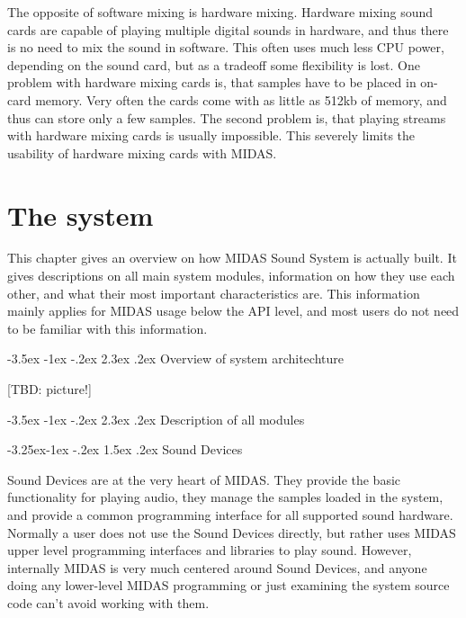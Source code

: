 \documentclass[a4paper,12pt,oneside]{book}
\makeatletter
\renewcommand\section{\@startsection {section}{1}{-20pt}%
                                   {-3.5ex \@plus -1ex \@minus -.2ex}%
                                   {2.3ex \@plus.2ex}%
                                   {\normalfont\Large\bfseries}}
\renewcommand\subsection{\@startsection{subsection}{2}{-20pt}%
                                     {-3.25ex\@plus -1ex \@minus -.2ex}%
                                     {1.5ex \@plus .2ex}%
                                     {\normalfont\large\bfseries}}
\makeatother
\begin{document}
The opposite of software mixing is hardware mixing. Hardware mixing sound
cards are capable of playing multiple digital sounds in hardware, and thus
there is no need to mix the sound in software. This often uses much less CPU
power, depending on the sound card, but as a tradeoff some flexibility is
lost. One problem with hardware mixing cards is, that samples have to be
placed in on-card memory. Very often the cards come with as little as 512kb
of memory, and thus can store only a few samples. The second problem is, that
playing streams with hardware mixing cards is usually impossible. This
severely limits the usability of hardware mixing cards with MIDAS.







\chapter{The system}

This chapter gives an overview on how MIDAS Sound System is actually built.
It gives descriptions on all main system modules, information on how they use
each other, and what their most important characteristics are. This
information mainly applies for MIDAS usage below the API level, and most
users do not need to be familiar with this information.


\section{Overview of system architechture}

[TBD: picture!]


\section{Description of all modules}

\subsection{Sound Devices}

Sound Devices are at the very heart of MIDAS. They provide the basic
functionality for playing audio, they manage the samples loaded in the
system, and provide a common programming interface for all supported sound
hardware. Normally a user does not use the Sound Devices directly, but rather
uses MIDAS upper level programming interfaces and libraries to play sound.
However, internally MIDAS is very much centered around Sound Devices, and
anyone doing any lower-level MIDAS programming or just examining the system
source code can't avoid working with them.
\end{document}
